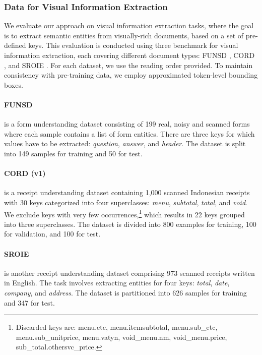 \subsubsection{Data for Visual Information Extraction}

We evaluate our approach on visual information extraction tasks, where the goal is to extract semantic entities from visually-rich documents, based on a set of pre-defined keys. This evaluation is conducted using three benchmark for visual information extraction, each covering different document types: FUNSD \citep{jaume2019funsd}, CORD \citep{park2019cord}, and SROIE \citep{huang2019icdar2019}. For each dataset, we use the reading order provided. To maintain consistency with pre-training data, we employ approximated token-level bounding boxes.

\paragraph{FUNSD} \citep{jaume2019funsd} is a form understanding dataset consisting of 199 real, noisy and scanned forms where each sample contains a list of form entities. There are three keys for which values have to be extracted: \textit{question}, \textit{answer}, and \textit{header}. The dataset is split into 149 samples for training and 50 for test.

\paragraph{CORD (v1)} \citep{park2019cord} is a receipt understanding dataset containing 1,000 scanned Indonesian receipts with 30 keys categorized into four superclasses: \textit{menu}, \textit{subtotal}, \textit{total}, and \textit{void}. We exclude keys with very few occurrences,\footnote{Discarded keys are: menu.etc, menu.itemsubtotal, menu.sub\_etc, menu.sub\_unitprice, menu.vatyn, void\_menu.nm, void\_menu.price, sub\_total.othersvc\_price.} which results in 22 keys grouped into three superclasses. The dataset is divided into 800 examples for training, 100 for validation, and 100 for test.

\paragraph{SROIE} \citep{huang2019icdar2019} is another receipt understanding dataset comprising 973 scanned receipts written in English. The task involves extracting entities for four keys: \textit{total}, \textit{date}, \textit{company}, and \textit{address}. The dataset is partitioned into 626 samples for training and 347 for test. 

